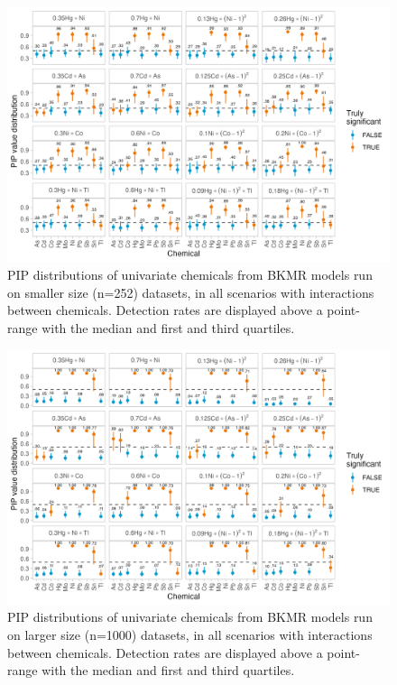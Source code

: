 \documentclass[12pt, twoside]{amherstthesis}
\begin{document}
\begin{figure}

{\centering \includegraphics[width=0.8\linewidth]{figures/ch4_ksm_univ_pips} 

}

\caption{PIP distributions of univariate chemicals from BKMR models run on smaller size (n=252) datasets, in all scenarios with interactions between chemicals. Detection rates are displayed above a point-range with the median and first and third quartiles.}\label{fig:ksmunivp}
\end{figure}
\begin{figure}

{\centering \includegraphics[width=0.8\linewidth]{figures/ch4_klg_univ_pips} 

}

\caption{PIP distributions of univariate chemicals from BKMR models run on larger size (n=1000) datasets, in all scenarios with interactions between chemicals. Detection rates are displayed above a point-range with the median and first and third quartiles.}\label{fig:klgunivp}
\end{figure}
\end{document}
